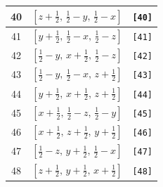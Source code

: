 \documentclass[fleqn,8pt]{jsarticle}
\begin{document}
\begin{longtable}{ccc}
40 & $\left[ z + \frac{1}{2},\, \frac{1}{2} - y,\, \frac{1}{2} - x \right]$ & {\tt [40]} \\ \hline
41 & $\left[ y + \frac{1}{2},\, \frac{1}{2} - x,\, \frac{1}{2} - z \right]$ & {\tt [41]} \\ \hline
42 & $\left[ \frac{1}{2} - y,\, x + \frac{1}{2},\, \frac{1}{2} - z \right]$ & {\tt [42]} \\ \hline
43 & $\left[ \frac{1}{2} - y,\, \frac{1}{2} - x,\, z + \frac{1}{2} \right]$ & {\tt [43]} \\ \hline
44 & $\left[ y + \frac{1}{2},\, x + \frac{1}{2},\, z + \frac{1}{2} \right]$ & {\tt [44]} \\ \hline
45 & $\left[ x + \frac{1}{2},\, \frac{1}{2} - z,\, \frac{1}{2} - y \right]$ & {\tt [45]} \\ \hline
46 & $\left[ x + \frac{1}{2},\, z + \frac{1}{2},\, y + \frac{1}{2} \right]$ & {\tt [46]} \\ \hline
47 & $\left[ \frac{1}{2} - z,\, y + \frac{1}{2},\, \frac{1}{2} - x \right]$ & {\tt [47]} \\ \hline
48 & $\left[ z + \frac{1}{2},\, y + \frac{1}{2},\, x + \frac{1}{2} \right]$ & {\tt [48]} \\
\end{longtable}
\end{document}
